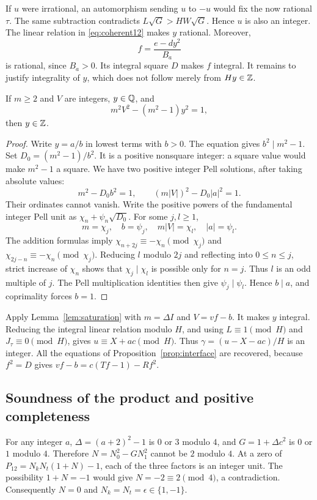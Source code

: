 If $u$ were irrational, an automorphism sending $u$ to $-u$ would fix the
now rational $\tau$. The same subtraction contradicts
$L\sqrt G>HW\sqrt G$. Hence $u$ is also an integer. The linear relation
in \eqref{eq:coherent12} makes $y$ rational. Moreover,
\[
 f=\frac{e-dy^2}{B_a}
\]
is rational, since $B_a>0$. Its integral square $D$ makes $f$ integral.
It remains to justify integrality of $y$, which does not follow merely
from $Hy\in\mathbb Z$.

\begin{lemma}
\label{lem:saturation}
If $m\ge2$ and $V$ are integers, $y\in\mathbb Q$, and
\[
 m^2V^2-(m^2-1)y^2=1,
\]
then $y\in\mathbb Z$.
\end{lemma}
\begin{proof}
Write $y=a/b$ in lowest terms with $b>0$. The equation gives
$b^2\mid m^2-1$. Set $D_0=(m^2-1)/b^2$. It is a positive nonsquare
integer: a square value would make $m^2-1$ a square. We have two positive
integer Pell solutions, after taking absolute values:
\[
 m^2-D_0b^2=1,\qquad (m|V|)^2-D_0|a|^2=1.
\]
Their ordinates cannot vanish. Write the positive powers of the fundamental
integer Pell unit as $\chi_n+\psi_n\sqrt{D_0}$. For some $j,l\ge1$,
\[
 m=\chi_j,\quad b=\psi_j,\quad m|V|=\chi_l,\quad |a|=\psi_l.
\]
The addition formulas imply
$\chi_{n+2j}\equiv-\chi_n\pmod{\chi_j}$ and
$\chi_{2j-n}\equiv-\chi_n\pmod{\chi_j}$. Reducing $l$ modulo $2j$ and
reflecting into $0\le n\le j$, strict increase of $\chi_n$ shows that
$\chi_j\mid\chi_l$ is possible only for $n=j$. Thus $l$ is an odd multiple
of $j$. The Pell multiplication identities then give $\psi_j\mid\psi_l$.
Hence $b\mid a$, and coprimality forces $b=1$.
\end{proof}

Apply Lemma~\ref{lem:saturation} with $m=\Delta I$ and $V=vf-b$. It makes
$y$ integral. Reducing the integral linear relation modulo $H$, and using
$L\equiv1\pmod H$ and $J_\tau\equiv0\pmod H$, gives
$u\equiv X+ac\pmod H$. Thus
$\gamma=(u-X-ac)/H$ is an integer. All the equations of
Proposition~\ref{prop:interface} are recovered, because $f^2=D$ gives
$vf-b=c(Tf-1)-Rf^2$.

\subsection{Soundness of the product and positive completeness}
For any integer $a$, $\Delta=(a+2)^2-1$ is $0$ or $3$ modulo $4$, and
$G=1+\Delta c^2$ is $0$ or $1$ modulo $4$. Therefore
$N=N_0^2-GN_1^2$ cannot be $2$ modulo $4$. At a zero of
$P_{12}=N_kN_t(1+N)-1$, each of the three factors is an integer unit.
The possibility $1+N=-1$ would give $N=-2\equiv2\pmod4$, a contradiction.
Consequently $N=0$ and $N_k=N_t=\epsilon\in\{1,-1\}$.

